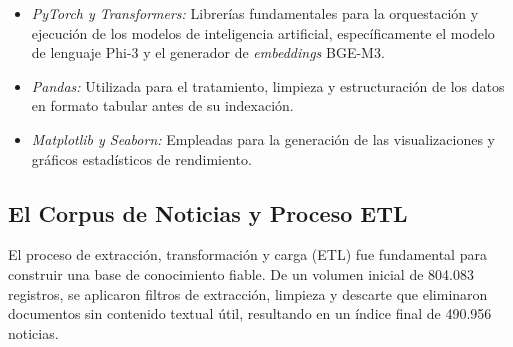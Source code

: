 \begin{itemize}
\begin{itemize}
        \item \textit{PyTorch y Transformers:} Librerías fundamentales para la orquestación y ejecución de los modelos de inteligencia artificial, específicamente el modelo de lenguaje Phi-3 y el generador de \textit{embeddings} BGE-M3.
        \item \textit{Pandas:} Utilizada para el tratamiento, limpieza y estructuración de los datos en formato tabular antes de su indexación.
        \item \textit{Matplotlib y Seaborn:} Empleadas para la generación de las visualizaciones y gráficos estadísticos de rendimiento.
    \end{itemize}
\end{itemize}

\subsection{El Corpus de Noticias y Proceso ETL}

El proceso de extracción, transformación y carga (ETL) fue fundamental para construir una base de conocimiento fiable. De un volumen inicial de 804.083 registros, se aplicaron filtros de extracción, limpieza y descarte que eliminaron documentos sin contenido textual útil, resultando en un índice final de 490.956 noticias.

